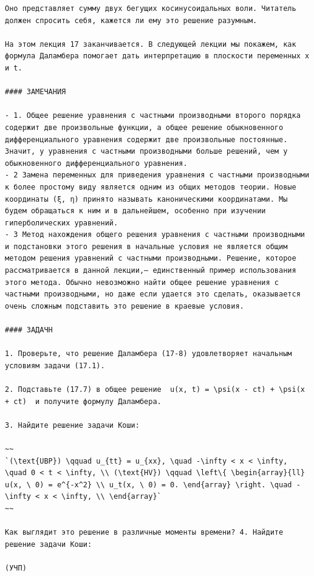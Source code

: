 \documentclass[
  ukrainian,
]{article}
\begin{document}
\begin{verbatim}
Оно представляет сумму двух бегущих косинусоидальных воли. Читатель должен спросить себя, кажется ли ему это решение разумным.

На этом лекция 17 заканчивается. В следующей лекции мы покажем, как формула Даламбера помогает дать интерпретацию в плоскости переменных x и t.

#### ЗАМЕЧАНИЯ

- 1. Общее решение уравнения с частными производными второго порядка содержит две произвольные функции, а общее решение обыкновенного дифференциального уравнения содержит две произвольные постоянные. Значит, у уравнения с частными производными больше решений, чем у обыкновенного дифференциального уравнения.
- 2 Замена переменных для приведения уравнения с частными производными к более простому виду является одним из общих методов теории. Новые координаты (ξ, η) принято называть каноническими координатами. Мы будем обращаться к ним и в дальнейшем, особенно при изучении гиперболических уравнений.
- 3 Метод нахождения общего решения уравнения с частными производными и подстановки этого решения в начальные условия не является общим методом решения уравнений с частными производными. Решение, которое рассматривается в данной лекции,— единственный пример использования этого метода. Обычно невозможно найти общее решение уравнения с частными производными, но даже если удается это сделать, оказывается очень сложным подставить это решение в краевые условия.

#### ЗАДАЧН

1. Проверьте, что решение Даламбера (17-8) удовлетворяет начальным условиям задачи (17.1).

2. Подставьте (17.7) в общее решение  u(x, t) = \psi(x - ct) + \psi(x + ct)  и получите формулу Даламбера.

3. Найдите решение задачи Коши:

~~
`(\text{UBP}) \qquad u_{tt} = u_{xx}, \quad -\infty < x < \infty, \quad 0 < t < \infty, \\ (\text{HV}) \qquad \left\{ \begin{array}{ll} u(x, \ 0) = e^{-x^2} \\ u_t(x, \ 0) = 0. \end{array} \right. \quad -\infty < x < \infty, \\ \end{array}`
~~

Как выглядит это решение в различные моменты времени? 4. Найдите решение задачи Коши:

(УЧП)
\end{verbatim}
\end{document}
